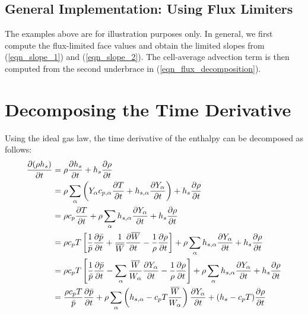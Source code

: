 \subsection{General Implementation: Using Flux Limiters}
The examples above are for illustration purposes only.  In general, we first compute the flux-limited face values and obtain the limited slopes from (\ref{eqn_slope_1}) and (\ref{eqn_slope_2}).  The cell-average advection term is then computed from the second underbrace in (\ref{eqn_flux_decomposition}).


\section{Decomposing the Time Derivative}
\label{app_time_derivative}

Using the ideal gas law, the time derivative of the enthalpy can be decomposed as follows:
\begin{align}
\label{eqn_drhdt}
\frac{\partial (\rho h_s)}{\partial t} &= \rho \frac{\partial h_s}{\partial t} + h_s \frac{\partial \rho}{\partial t} \notag\\
&= \rho \sum_\alpha \left( Y_\alpha c_{p,\alpha} \frac{\partial T}{\partial t} + h_{s,\alpha} \frac{\partial Y_\alpha}{\partial t}\right) + h_s \frac{\partial \rho}{\partial t} \notag\\
&= \rho c_p \frac{\partial T}{\partial t} + \rho \sum_\alpha h_{s,\alpha} \frac{\partial Y_\alpha}{\partial t} + h_s \frac{\partial \rho}{\partial t} \notag\\
&= \rho c_p T \left[ \frac{1}{\bar{p}} \frac{\partial \bar{p}}{\partial t} + \frac{1}{\overline{W}} \frac{\partial \overline{W}}{\partial t} - \frac{1}{\rho} \frac{\partial \rho}{\partial t}\right] + \rho \sum_\alpha h_{s,\alpha} \frac{\partial Y_\alpha}{\partial t} + h_s \frac{\partial \rho}{\partial t} \notag\\
&= \rho c_p T \left[ \frac{1}{\bar{p}} \frac{\partial \bar{p}}{\partial t} - \sum_\alpha \frac{\overline{W}}{W_\alpha} \frac{\partial Y_\alpha}{\partial t} - \frac{1}{\rho} \frac{\partial \rho}{\partial t}\right] + \rho \sum_\alpha h_{s,\alpha} \frac{\partial Y_\alpha}{\partial t} + h_s \frac{\partial \rho}{\partial t} \notag\\
&=  \frac{\rho c_p T}{\bar{p}} \frac{\partial \bar{p}}{\partial t}  + \rho \sum_\alpha \left( h_{s,\alpha} - c_p T \frac{\overline{W}}{W_\alpha}\right)\frac{\partial Y_\alpha}{\partial t} + (h_s - c_p T) \frac{\partial \rho}{\partial t}
\end{align}
